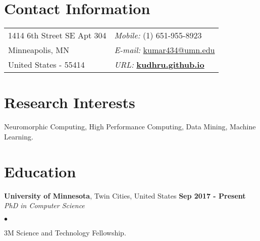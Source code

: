 \documentclass[margin,line]{res}
\newenvironment{list2}{
  \begin{list}{$\bullet$}{%
      \setlength{\itemsep}{0in}
      \setlength{\parsep}{0in} \setlength{\parskip}{0in}
      \setlength{\topsep}{0in} \setlength{\partopsep}{0in} 
      \setlength{\leftmargin}{0.2in}}}{\end{list}}
\begin{document}

\begin{resume}
\section{\sc Contact Information}
\vspace{.05in}
\begin{tabular}{@{}p{3in}p{4in}}
1414 6th Street SE Apt 304         & {\it Mobile:}  (1) 651-955-8923 \\            
 Minneapolis, MN & {\it E-mail:}  \href{mailto:kumar434@umn.edu }{kumar434@umn.edu }\\
 United States - 55414 &{\it URL:}  \href{http://kudhru.github.io}{\bf kudhru.github.io}
\end{tabular}


\section{\sc Research Interests}
Neuromorphic Computing, High Performance Computing, Data Mining, Machine Learning.

\section{\sc Education}
{\bf University of Minnesota}, Twin Cities, United States \hfill {\bf {Sep 2017 - Present}}\\
{\em PhD in Computer Science }
\vspace*{.3cm}
\begin{list2}
\item 3M Science and Technology Fellowship.


\end{list2}
\end{resume}
\end{document}
